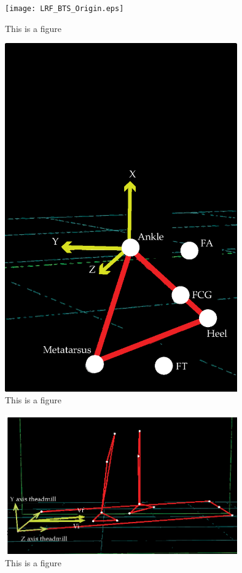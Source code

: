 \documentclass[journal,article,submit,moreauthors,pdftex,10pt,a4paper]{mdpi}
\theoremstyle{mdpi}
\newcounter{ex}
\newcounter{re}
\theoremstyle{mdpidefinition}
\begin{document}
\begin{figure}[H]
\centering
\texttt{[image: LRF\_BTS\_Origin.eps]}
\caption{This is a figure}
\end{figure}   

\begin{figure}[H]
\centering
\includegraphics[width=10cm]{Foot_center_gravity.eps}
\caption{This is a figure}
\end{figure}   

\begin{figure}[H]
\centering
\includegraphics[width=10cm]{Inclinacion_Bandasinfin.eps}
\caption{This is a figure}
\end{figure}
\end{document}
